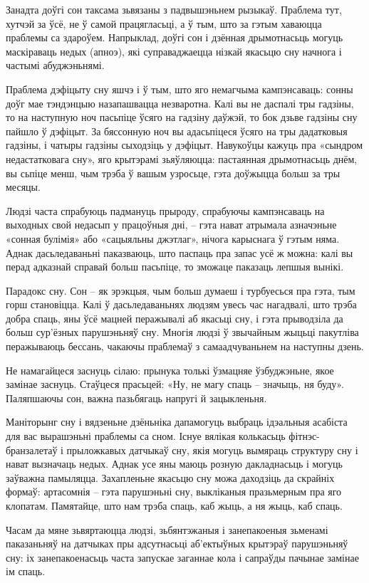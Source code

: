 Занадта доўгі сон таксама зьвязаны з падвышэньнем рызыкаў. Праблема тут, хутчэй за ўсё, не ў самой працягласьці, а ў тым, што за гэтым хаваюцца праблемы са здароўем. Напрыклад, доўгі сон і дзённая дрымотнасьць могуць маскіраваць недых (апноэ), які суправаджаецца нізкай якасьцю сну начнога і частымі абуджэньнямі.

Праблема дэфіцыту сну яшчэ і ў тым, што яго немагчыма кампэнсаваць: сонны доўг мае тэндэнцыю назапашвацца незваротна. Калі вы не даспалі тры гадзіны, то на наступную ноч пасьпіце ўсяго на гадзіну даўжэй, то бок дзьве гадзіны сну пайшло ў дэфіцыт. За бяссонную ноч вы адасьпіцеся ўсяго на тры дадатковыя гадзіны, і чатыры гадзіны сыходзіць у дэфіцыт. Навукоўцы кажуць пра «сындром недастатковага сну», яго крытэрамі зьяўляюцца: пастаянная дрымотнасьць днём, вы сьпіце менш, чым трэба ў вашым узросьце, гэта доўжыцца больш за тры месяцы.

Людзі часта спрабуюць падмануць прыроду, спрабуючы кампэнсаваць на выходных свой недасып у працоўныя дні, – гэта нават атрымала азначэньне «сонная булімія» або «сацыяльны джэтлаг», нічога карыснага ў гэтым няма. Аднак дасьледаваньні паказваюць, што паспаць пра запас усё ж можна: калі вы перад адказнай справай больш пасьпіце, то зможаце паказаць лепшыя вынікі.

Парадокс сну. Сон – як эрэкцыя, чым больш думаеш і турбуесься пра гэта, тым горш становіцца. Калі ў дасьледаваньнях людзям увесь час нагадвалі, што трэба добра спаць, яны ўсё мацней перажывалі аб якасьці сну, і гэта прыводзіла да больш сур'ёзных парушэньняў сну. Многія людзі ў звычайным жыцьці пакутліва перажываюць бессань, чакаючы праблемаў з самаадчуваньнем на наступны дзень.

Не намагайцеся заснуць сілаю: прынука толькі ўзмацняе ўзбуджэньне, якое замінае заснуць. Стаўцеся прасьцей: «Ну, не магу спаць – значыць, ня буду». Паляпшаючы сон, важна пазьбягаць напругі й зацыкленьня.

Маніторынг сну і вядзеньне дзёньніка дапамогуць выбраць ідэальныя асабіста для вас вырашэньні праблемы са сном. Існуе вялікая колькасьць фітнэс-бранзалетаў і прыложкавых датчыкаў сну, якія могуць вымяраць структуру сну і нават вызначаць недых. Аднак усе яны маюць розную дакладнасьць і могуць заўважна памыляцца. Захапленьне якасьцю сну можа даходзіць да скрайніх формаў: артасомнія – гэта парушэньні сну, выкліканыя празьмерным пра яго клопатам. Памятайце, што нам трэба спаць, каб жыць, а ня жыць, каб спаць.

Часам да мяне зьвяртаюцца людзі, зьбянтэжаныя і занепакоеныя зьменамі паказаньняў на датчыках пры адсутнасьці аб'ектыўных крытэраў парушэньняў сну: іх занепакоенасьць часта запускае заганнае кола і сапраўды пачынае замінае ім спаць.

